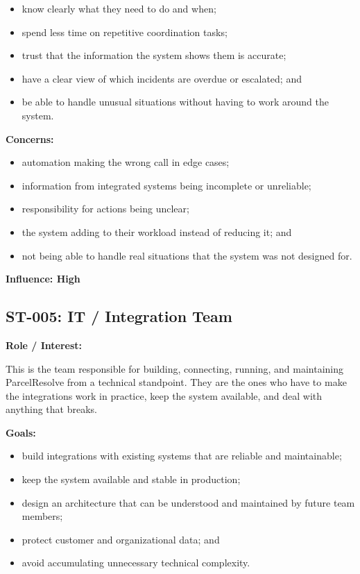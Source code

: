 \documentclass[11pt,a4paper]{article}
\begin{document}
\begin{itemize}
    \item know clearly what they need to do and when;
    \item spend less time on repetitive coordination tasks;
    \item trust that the information the system shows them is
    accurate;
    \item have a clear view of which incidents are overdue or
    escalated; and
    \item be able to handle unusual situations without having to
    work around the system.
\end{itemize}

\textbf{Concerns:}

\begin{itemize}
    \item automation making the wrong call in edge cases;
    \item information from integrated systems being incomplete or
    unreliable;
    \item responsibility for actions being unclear;
    \item the system adding to their workload instead of reducing
    it; and
    \item not being able to handle real situations that the system
    was not designed for.
\end{itemize}

\textbf{Influence: High}


\subsection{ST-005: IT / Integration Team}

\textbf{Role / Interest:}

This is the team responsible for building, connecting, running,
and maintaining ParcelResolve from a technical standpoint. They are
the ones who have to make the integrations work in practice, keep
the system available, and deal with anything that breaks.

\textbf{Goals:}

\begin{itemize}
    \item build integrations with existing systems that are
    reliable and maintainable;
    \item keep the system available and stable in production;
    \item design an architecture that can be understood and
    maintained by future team members;
    \item protect customer and organizational data; and
    \item avoid accumulating unnecessary technical complexity.
\end{itemize}
\end{document}
